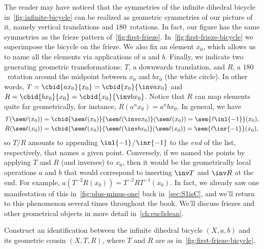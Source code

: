 \begin{remark}\label{rem:inf-dihedral-frieze}
  The reader may have noticed that the symmetries of the
  infinite dihedral bicycle in~\cref{fig:infinite-bicycle}
  can be realized as geometric symmetries of our picture of it,
  namely vertical translations and $180$\textdegree\ rotations.
  In fact, our figure has the same symmetries as the frieze pattern
  of~\cref{fig:first-frieze}.
  In~\cref{fig:first-frieze-bicycle} we superimpose the bicycle on
  the frieze. We also fix an element $x_0$, which allows
  us to name all the elements via applications of $a$ and $b$.
  Finally, we indicate two generating geometric transformations:
  $T$, a downwards translation, and $R$, a $180$\textdegree\ rotation
  around the midpoint between $x_0$ and $bx_0$ (the white circle).
  In other words, $T = \cbid{ax_0}{x_0} = \cbid{x_0}{\inv ax_0}$
  and $R = \cbid{bx_0}{x_0} = \cbid{x_0}{\inv bx_0}$.
  Notice that $R$ can map elements quite far geometrically,
  for instance, $R(a^nx_0) = a^nbx_0$.
  In general, we have
  \begin{align*}
    T(\sem\ell(x_0)) &= \cbid{\sem\ell(x_0)}{\sem\ell(\inv ax_0)}(\sem\ell(x_0))
                       = \sem{\ell \inl{-1}}(x_0),\\
    R(\sem\ell(x_0)) &= \cbid{\sem\ell(x_0)}{\sem\ell(\inv bx_0)}(\sem\ell(x_0))
                       = \sem{\ell \inr{-1}}(x_0),
  \end{align*}
  so $T$/$R$ amounts to appending $\inl{-1}$/$\inr{-1}$ to the \emph{end} of the list,
  respectively, that names a given point.
  Conversely, if we named the points by applying $T$ and $R$ (and inverses)
  to $x_0$, then it would be the geometrically local operations $a$ and $b$
  that would correspond to inserting $\inv T$ and $\inv R$ at the end.
  For example, $a(T^{-2}R(x_0)) = T^{-2}RT^{-1}(x_0)$.
  In fact, we already saw one manifestation of this
  in~\cref{fig:plus-minus-one} back in~\cref{sec:S1isC},
  and we'll return to this phenomenon several times throughout the book.
  We'll discuss friezes and other geometrical objects in
  more detail in~\cref{ch:euclidean}.
\end{remark}
\begin{xca}\label{xca:inf-dihedral-bicycle}
  Construct an identification between the infinite dihedral bicycle
  $(X,a,b)$ and its geometric cousin $(X,T,R)$, where
  $T$ and $R$ are as in~\cref{fig:first-frieze-bicycle}.
\end{xca}
